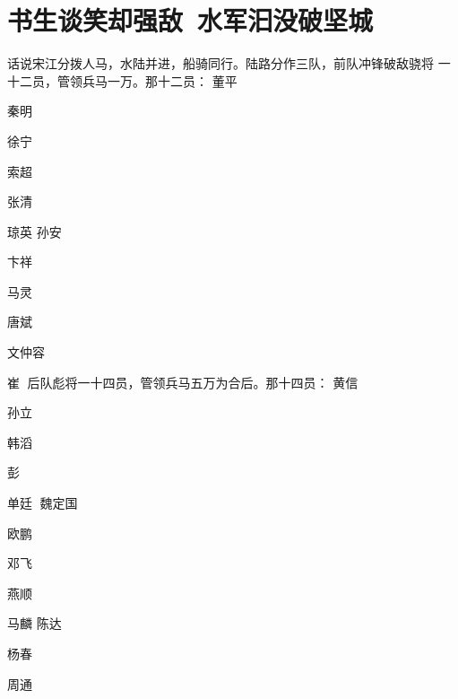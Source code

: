 \chapter{书生谈笑却强敌~水军汩没破坚城}

话说宋江分拨人马，水陆并进，船骑同行。陆路分作三队，前队冲锋破敌骁将
一十二员，管领兵马一万。那十二员：
董平

秦明

徐宁

索超

张清

琼英
孙安

卞祥

马灵

唐斌

文仲容

崔
后队彪将一十四员，管领兵马五万为合后。那十四员：
黄信

孙立

韩滔

彭

单廷
魏定国

欧鹏

邓飞

燕顺

马麟
陈达

杨春

周通

